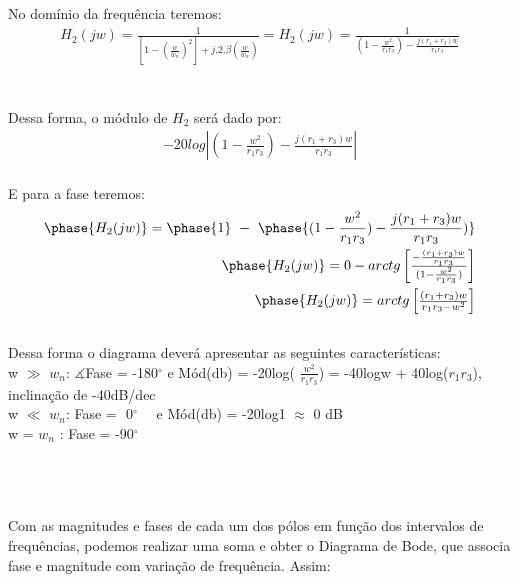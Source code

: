 \documentclass[a4paper,12pt,twoside]{article}
\begin{document}
No domínio da frequência teremos:
\begin{equation}
\begin{split}
H_{2}(jw)=\frac{1}{[1-(\frac{w}{w_{n}})^2] + j.2.\beta (\frac{w}{w_{n}})} = 
H_{2}(jw)=\frac{1}{(1-\frac{w^2}{r_{1}r_{3}}) - \frac{j(r_{1}+r_{3})w}{r_{1}r_{3}}}
\end{split}
\end{equation} \\ \\
Dessa forma, o módulo de $H_{2}$ será dado por:
\begin{equation}
\begin{split}
-20 log\left | (1 - \frac{w^2}{r_{1}r_{3}}) -\frac{ j (r_{1}+r_{3})w}{r_{1}r_{3}}\right |
\end{split}
\end{equation} \\
E para a fase teremos:
\begin{equation}
\begin{split} 
\phase{H_{2}(jw)} = \phase{1} \,\,-\,\,   \phase{
(1-\frac{w^2}{r_{1}r_{3}})-\frac{ j (r_{1}+r_{3})w}{r_{1}r_{3}})}
 \\  
\phase{H_{2}(jw)} = 0 - arctg\begin{bmatrix}\frac{-\frac{(r_{1}+r_{3})w}{r_{1}r_{3}}}{(1-\frac{w^2}{r_{1}r_{3}})}\end{bmatrix}\\
\phase{H_{2}(jw)} = arctg\begin{bmatrix}\frac{(r_{1}+r_{3})w}{r_{1}r_{3}-w^2}\end{bmatrix}
\end{split}
\end{equation} \\
Dessa forma o diagrama deverá apresentar as seguintes características:\\
w $\gg$ $w_{n}$: $\measuredangle$Fase =  -180$^{\circ}$ e Mód(db) = -20log( $\frac{w^2}{r_{1}r_{3}}$) = -40logw + 40log($r_{1}r_{3}$), inclinação de -40dB/dec\\
w $\ll$ $w_{n}$:  Fase = \,\,0$^{\circ}$ \,\,\,\, e Mód(db) = -20log1 $\approx$ 0 dB\\
w = $w_{n}$ : Fase = -90$^{\circ}$ 

\\ \\ \\
\indent Com as magnitudes e fases de cada um dos pólos em função dos intervalos de frequências, podemos realizar uma soma e obter o Diagrama de Bode, que associa fase e magnitude com variação de frequência. Assim:
\end{document}

